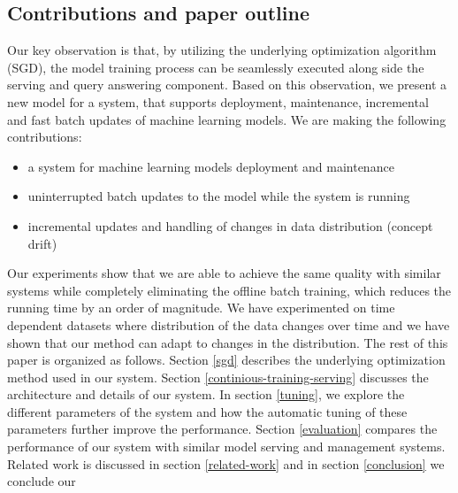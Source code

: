 \documentclass{sig-alternate-05-2015}
\begin{document}
\subsection{Contributions and paper outline}
Our key observation is that, by utilizing the underlying optimization algorithm (SGD), the model training process can be seamlessly executed along side the serving and query answering component.
Based on this observation, we present a new model for a system, that supports deployment, maintenance, incremental and fast batch updates of machine learning models.
We are making the following contributions: 
\begin{itemize}
\item a system for machine learning models deployment and maintenance
\item uninterrupted batch updates to the model while the system is running
\item incremental updates and handling of changes in data distribution (concept drift) 
\end{itemize}
Our experiments show that we are able to achieve the same quality with similar systems while completely eliminating the offline batch training, which reduces the running time by an order of magnitude. 
We have experimented on time dependent datasets where distribution of the data changes over time and we have shown that our method can adapt to changes in the distribution.
The rest of this paper is organized as follows. 
Section \ref{sgd} describes the underlying optimization method used in our system. 
Section \ref{continious-training-serving} discusses the architecture and details of our system. 
In section \ref{tuning}, we explore the different parameters of the system and how the automatic tuning of these parameters further improve the performance.
Section \ref{evaluation} compares the performance of our system with similar model serving and management systems. 
Related work is discussed in section \ref{related-work} and in section \ref{conclusion} we conclude our 
\end{document}
